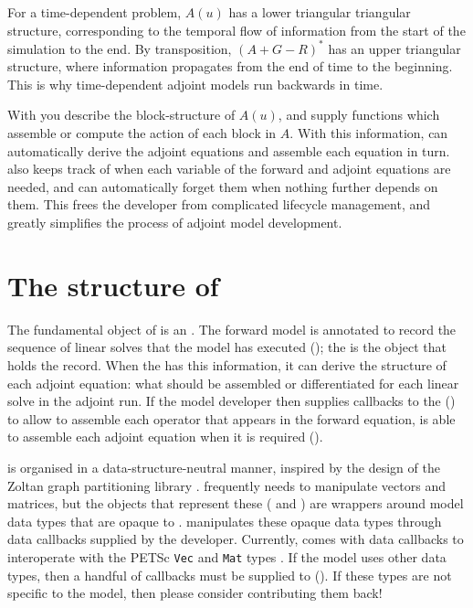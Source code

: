 For a time-dependent problem, $A(u)$ has a lower triangular triangular structure,
corresponding to the temporal flow of information from the start of the simulation
to the end. By transposition, $(A + G - R)^*$ has an upper triangular structure, where
information propagates from the end of time to the beginning. This is why time-dependent adjoint
models run backwards in time.

With \libadjoint you describe the block-structure of $A(u)$,
and supply functions which assemble or compute the action of each block in $A$.
With this information, \libadjoint can automatically derive the adjoint equations
and assemble each equation in turn. \libadjoint also keeps track of when each
variable of the forward and adjoint equations are needed, and can automatically
forget them when nothing further depends on them. This frees the developer from
complicated lifecycle management, and greatly simplifies the process of adjoint model
development.

\section{The structure of \libadjoint}
The fundamental object of \libadjoint is an . The forward model is annotated
to record the sequence of linear solves that the model has executed (); the  is
the object that holds the record. When the  has this information, it can derive
the structure of each adjoint equation: what should be assembled or differentiated for each linear
solve in the adjoint run. If the model developer then
supplies callbacks to the  () to allow \libadjoint to assemble each
operator that appears in the forward equation, \libadjoint is
able to assemble each adjoint equation when it is required ().

\libadjoint is organised in a data-structure-neutral manner, inspired by the design
of the Zoltan graph partitioning library \citep{devine2002}. \libadjoint frequently needs to manipulate vectors
and matrices, but the objects that represent these ( and )
are wrappers around model data types that are opaque to \libadjoint. \libadjoint manipulates
these opaque data types through data callbacks supplied by the developer. Currently, \libadjoint
{}
comes with data callbacks to interoperate with the PETSc \texttt{Vec} and \texttt{Mat} types \citep{balay2010}.
If the model uses other data types, then a handful of callbacks must be supplied to \libadjoint ().
If these types are not specific to the model, then please consider contributing them back!

